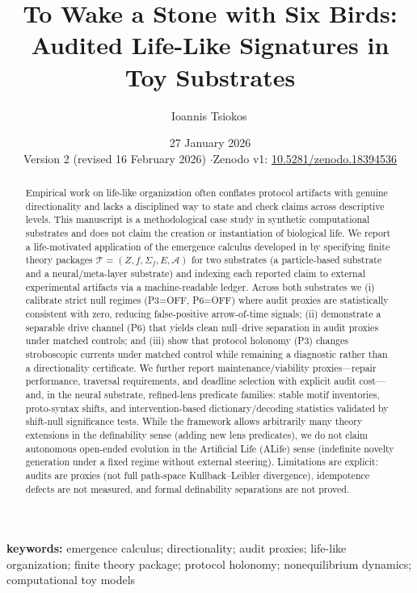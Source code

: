 \documentclass[11pt]{article}
\title{To Wake a Stone with Six Birds: Audited Life-Like Signatures in Toy Substrates}
\author{Ioannis Tsiokos\,\orcidlink{0009-0009-7659-5964}}
\date{27 January 2026\\[4pt]{\small Version 2 (revised 16 February 2026) \quad$\cdot$\quad Zenodo v1: \href{https://doi.org/10.5281/zenodo.18394536}{10.5281/zenodo.18394536}}}
\newcommand{\Tpkg}{\mathcal T}
\newcommand{\Audit}{\mathcal A}
\newcommand{\Sig}{\Sigma}
\begin{document}
\maketitle
\thispagestyle{firstpage}

\begin{abstract}
Empirical work on life-like organization often conflates protocol artifacts with genuine directionality and lacks a disciplined way to state and check claims across descriptive levels. This manuscript is a methodological case study in synthetic computational substrates and does not claim the creation or instantiation of biological life. We report a life-motivated application of the emergence calculus developed in \citet{tsiokos2026sixbirds} by specifying finite theory packages $\Tpkg=(Z,f,\Sig_f,E,\Audit)$ for two substrates (a particle-based substrate and a neural/meta-layer substrate) and indexing each reported claim to external experimental artifacts via a machine-readable ledger. Across both substrates we (i) calibrate strict null regimes (P3=OFF, P6=OFF) where audit proxies are statistically consistent with zero, reducing false-positive arrow-of-time signals; (ii) demonstrate a separable drive channel (P6) that yields clean null--drive separation in audit proxies under matched controls; and (iii) show that protocol holonomy (P3) changes stroboscopic currents under matched control while remaining a diagnostic rather than a directionality certificate. We further report maintenance/viability proxies---repair performance, traversal requirements, and deadline selection with explicit audit cost---and, in the neural substrate, refined-lens predicate families: stable motif inventories, proto-syntax shifts, and intervention-based dictionary/decoding statistics validated by shift-null significance tests. While the framework allows arbitrarily many theory extensions in the definability sense (adding new lens predicates), we do not claim autonomous open-ended evolution in the Artificial Life (ALife) sense (indefinite novelty generation under a fixed regime without external steering). Limitations are explicit: audits are proxies (not full path-space Kullback--Leibler divergence), idempotence defects are not measured, and formal definability separations are not proved.
\end{abstract}

\noindent\textbf{keywords:} emergence calculus; directionality; audit proxies; life-like organization; finite theory package; protocol holonomy; nonequilibrium dynamics; computational toy models
\end{document}
